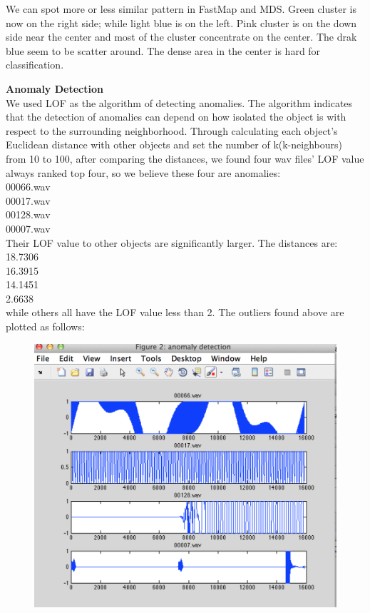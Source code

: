\begin{enumerate}
\begin{enumerate}
We can spot more or less similar pattern in FastMap and MDS. Green cluster is now on the right side; while light blue is on the left. Pink cluster is on the down side near the center and most of the cluster concentrate on the center. The drak blue seem to be scatter around. The dense area in the center is hard for classification.
\end{enumerate}
\textbf{Anomaly Detection}\\
We used LOF as the algorithm of detecting anomalies. The algorithm indicates that the detection of anomalies can depend on how isolated the object is with respect to the
surrounding neighborhood. Through calculating each object's Euclidean distance with other objects and set the number of k(k-neighbours) from 10 to 100, after comparing the distances, we found four wav files' LOF value always ranked top four, so we believe these four are anomalies:\\
00066.wav\\
00017.wav\\
00128.wav\\
00007.wav\\
Their LOF value to other objects are significantly larger. The distances are:\\
18.7306\\
16.3915\\
14.1451\\
2.6638\\
while others all have the LOF value less than 2.
The outliers found above are plotted as follows:\\
\begin{figure}[H]
\centering
\includegraphics[scale=.6]{PIC/outliers}

\end{figure}
\end{enumerate}
